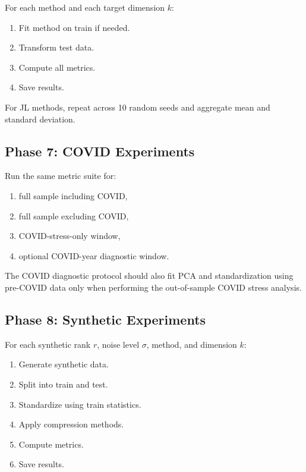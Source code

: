 \documentclass[11pt]{article}
\begin{document}
For each method and each target dimension $k$:

\begin{enumerate}
    \item Fit method on train if needed.
    \item Transform test data.
    \item Compute all metrics.
    \item Save results.
\end{enumerate}

For JL methods, repeat across 10 random seeds and aggregate mean and standard deviation.

\subsection{Phase 7: COVID Experiments}

Run the same metric suite for:

\begin{enumerate}
    \item full sample including COVID,
    \item full sample excluding COVID,
    \item COVID-stress-only window,
    \item optional COVID-year diagnostic window.
\end{enumerate}

The COVID diagnostic protocol should also fit PCA and standardization using pre-COVID data only when performing the out-of-sample COVID stress analysis.

\subsection{Phase 8: Synthetic Experiments}

For each synthetic rank $r$, noise level $\sigma$, method, and dimension $k$:

\begin{enumerate}
    \item Generate synthetic data.
    \item Split into train and test.
    \item Standardize using train statistics.
    \item Apply compression methods.
    \item Compute metrics.
    \item Save results.
\end{enumerate}
\end{document}
